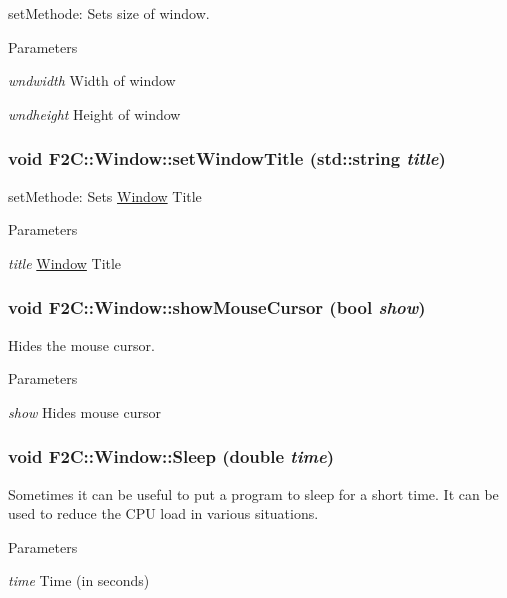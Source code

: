 setMethode: Sets size of window. 
\begin{DoxyParams}{Parameters}
\item[{\em wndwidth}]Width of window \item[{\em wndheight}]Height of window \end{DoxyParams}
\hypertarget{class_f2_c_1_1_window_a7d8c67d945748f4a2c2effcf4a29022d}{
\subsubsection[{setWindowTitle}]{\setlength{\rightskip}{0pt plus 5cm}void F2C::Window::setWindowTitle (std::string {\em title})}}
\label{class_f2_c_1_1_window_a7d8c67d945748f4a2c2effcf4a29022d}


setMethode: Sets \hyperlink{class_f2_c_1_1_window}{Window} Title 
\begin{DoxyParams}{Parameters}
\item[{\em title}]\hyperlink{class_f2_c_1_1_window}{Window} Title \end{DoxyParams}
\hypertarget{class_f2_c_1_1_window_af37f6f9549c2fc79b3421bccbb1c5bcd}{
\subsubsection[{showMouseCursor}]{\setlength{\rightskip}{0pt plus 5cm}void F2C::Window::showMouseCursor (bool {\em show})}}
\label{class_f2_c_1_1_window_af37f6f9549c2fc79b3421bccbb1c5bcd}


Hides the mouse cursor. 
\begin{DoxyParams}{Parameters}
\item[{\em show}]Hides mouse cursor \end{DoxyParams}
\hypertarget{class_f2_c_1_1_window_a1ee9014047dc994e2b32de4910ad6c49}{
\subsubsection[{Sleep}]{\setlength{\rightskip}{0pt plus 5cm}void F2C::Window::Sleep (double {\em time})}}
\label{class_f2_c_1_1_window_a1ee9014047dc994e2b32de4910ad6c49}


Sometimes it can be useful to put a program to sleep for a short time. It can be used to reduce the CPU load in various situations. 
\begin{DoxyParams}{Parameters}
\item[{\em time}]Time (in seconds) \end{DoxyParams}
